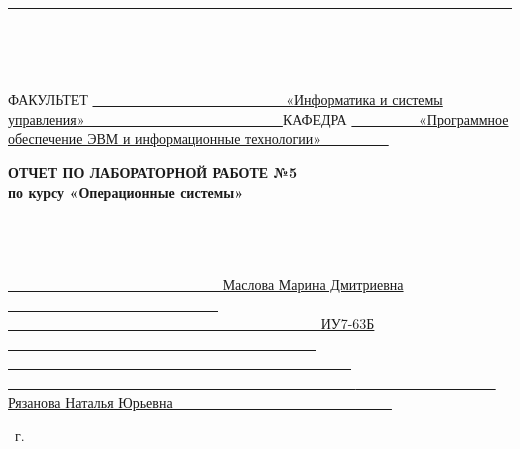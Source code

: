 \begin{titlepage}
    \noindent
	\rule{17cm}{3pt}
    ~\\
    \begin{spacing}{0.1}
        ~\\
    \end{spacing}
	\noindent ФАКУЛЬТЕТ
    \uline
    {
            ~~~~~~~~~~~~~~~~~~~~~~~~~~~
            «Информатика и системы управления»
            ~~~~~~~~~~~~~~~~~~~~~~~~~~~
    }
    \newline\newline
	\noindent КАФЕДРА
    \uline{
            ~~~~~~~~~
            «Программное обеспечение ЭВМ и информационные технологии»
            ~~~~~~~~~
        }
    \newline\newline
    \newline\newline
    \newline\newline
    \newline

	\fontsize{18pt}{18pt}\selectfont
	\begin{center}
        \textbf{ОТЧЕТ ПО ЛАБОРАТОРНОЙ РАБОТЕ №5}\\
        \textbf{по курсу «Операционные системы»}\\
        ~\\
        \fontsize{16pt}{16pt}\selectfont
        ~\\
	\end{center}
    ~\\

	\fontsize{14pt}{14pt}\selectfont
	\noindent{}
    \uline{
        ~~~~~~~~~~~~~~~~~~~~~~~~~~~~~~
        Маслова Марина Дмитриевна
        ~~~~~~~~~~~~~~~~~~~~~~~~~~~~~~
    }
    \newline\newline
	\noindent{}
    \uline{
        ~~~~~~~~~~~~~~~~~~~~~~~~~~~~~~~~~~~~~~~~~~~~
        ИУ7-63Б
        ~~~~~~~~~~~~~~~~~~~~~~~~~~~~~~~~~~~~~~~~~~~~
    }
    \newline\newline
	\noindent{}
    \uline{
        ~~~~~~~~~~~~~~~~~~~~~~~~~~~~~~~~~~~~~~~~~~~~~~~~~
        ~~~~~~~~~~~~~~~~~~~~~~~~~~~~~~~~~~~~~~~~~~~~~~~~~
    }
    \newline\newline
	\noindent{}
    \uline{
        ~~~~~~~~~~~~~~~~~~~~
        Рязанова Наталья Юрьевна
        ~~~~~~~~~~~~~~~~~~~~~~~~~~~~~~
    }
    \newline\newline
    \newline\newline
    ~\\
    \vspace{17mm}

	\begin{center}
		\the\year~г.
	\end{center}

    \restoregeometry
\end{titlepage}
